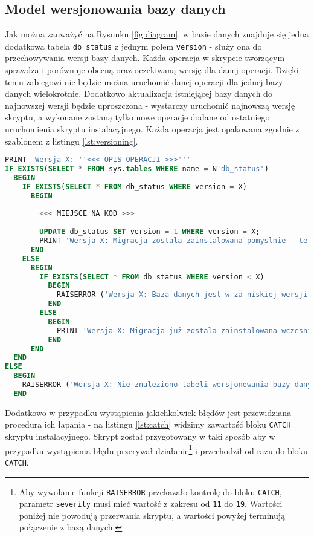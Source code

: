 \subsection{Model wersjonowania bazy danych}

Jak można zauważyć na Rysunku \ref{fig:diagram}, w bazie danych znajduje się jedna dodatkowa tabela \texttt{db\_status} z jednym polem \texttt{version} - służy ona do przechowywania wersji bazy danych.
Każda operacja w \href{run:skrypt_tworzacy_obiekty_w_bazie_danych.sql}{skrypcie tworzącym} sprawdza i porównuje obecną oraz oczekiwaną wersję dla danej operacji. 
Dzięki temu zabiegowi nie będzie można uruchomić danej operacji dla jednej bazy danych wielokrotnie. Dodatkowo aktualizacja istniejącej bazy danych do najnowszej wersji będzie uproszczona - wystarczy uruchomić najnowszą wersję skryptu, a wykonane zostaną tylko nowe operacje dodane od ostatniego uruchomienia skryptu instalacyjnego.
Każda operacja jest opakowana zgodnie z szablonem z listingu \ref{lst:versioning}.

\begin{lstlisting}[language=SQL, caption=Szablon kodu wersjonowanego, label={lst:versioning}]
PRINT 'Wersja X: ''<<< OPIS OPERACJI >>>'''
IF EXISTS(SELECT * FROM sys.tables WHERE name = N'db_status')
  BEGIN
    IF EXISTS(SELECT * FROM db_status WHERE version = X)
      BEGIN
		
		<<< MIEJSCE NA KOD >>>        
            
        UPDATE db_status SET version = 1 WHERE version = X;
        PRINT 'Wersja X: Migracja zostala zainstalowana pomyslnie - teraz baza jest w wersji X';
      END
    ELSE
      BEGIN
        IF EXISTS(SELECT * FROM db_status WHERE version < X)
          BEGIN
            RAISERROR ('Wersja X: Baza danych jest w za niskiej wersji (wymagana jest wersja X) aby zainstalowac migracje', 11, 2);
          END
        ELSE
          BEGIN
            PRINT 'Wersja X: Migracja już zostala zainstalowana wczesniej';
          END
      END
  END
ELSE
  BEGIN
    RAISERROR ('Wersja X: Nie znaleziono tabeli wersjonowania bazy danych', 11, 1);
  END
\end{lstlisting}

Dodatkowo w przypadku wystąpienia jakichkolwiek błędów jest przewidziana procedura ich łapania - na listingu \ref{lst:catch} widzimy zawartość bloku \texttt{CATCH} skryptu instalacyjnego. Skrypt został przygotowany w taki sposób aby w przypadku wystąpienia błędu przerywał działanie\footnote{Aby wywołanie funkcji \href{https://docs.microsoft.com/en-us/sql/t-sql/language-elements/raiserror-transact-sql?view=sql-server-2017}{\texttt{RAISERROR}} przekazało kontrolę do bloku \texttt{CATCH}, parametr \texttt{severity} musi mieć wartość z zakresu od \texttt{11} do \texttt{19}. Wartości poniżej nie powodują przerwania skryptu, a wartości powyżej terminują połączenie z bazą danych.} i przechodził od razu do bloku \texttt{CATCH}.

